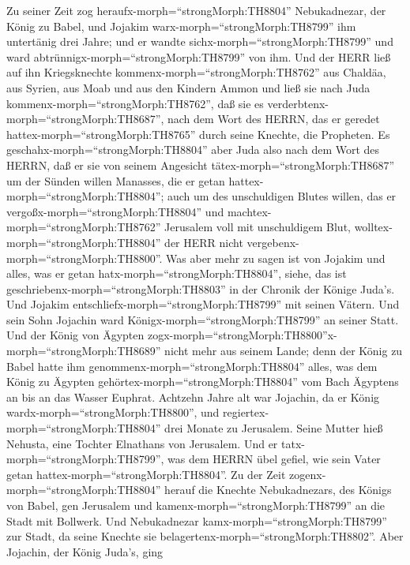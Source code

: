  Zu seiner Zeit zog heraufx-morph=``strongMorph:TH8804''
Nebukadnezar, der König zu Babel, und Jojakim
warx-morph=``strongMorph:TH8799'' ihm untertänig drei Jahre; und er
wandte sichx-morph=``strongMorph:TH8799'' und ward
abtrünnigx-morph=``strongMorph:TH8799'' von ihm.  Und der
HERR ließ auf ihn Kriegsknechte kommenx-morph=``strongMorph:TH8762'' aus
Chaldäa, aus Syrien, aus Moab und aus den Kindern Ammon und ließ sie
nach Juda kommenx-morph=``strongMorph:TH8762'', daß sie es
verderbtenx-morph=``strongMorph:TH8687'', nach dem Wort des HERRN, das
er geredet hattex-morph=``strongMorph:TH8765'' durch seine Knechte, die
Propheten.  Es geschahx-morph=``strongMorph:TH8804'' aber
Juda also nach dem Wort des HERRN, daß er sie von seinem Angesicht
tätex-morph=``strongMorph:TH8687'' um der Sünden willen Manasses, die er
getan hattex-morph=``strongMorph:TH8804'';  auch um des
unschuldigen Blutes willen, das er vergoßx-morph=``strongMorph:TH8804''
und machtex-morph=``strongMorph:TH8762'' Jerusalem voll mit unschuldigem
Blut, wolltex-morph=``strongMorph:TH8804'' der HERR nicht
vergebenx-morph=``strongMorph:TH8800''.  Was aber mehr zu
sagen ist von Jojakim und alles, was er getan
hatx-morph=``strongMorph:TH8804'', siehe, das ist
geschriebenx-morph=``strongMorph:TH8803'' in der Chronik der Könige
Juda's.  Und Jojakim
entschliefx-morph=``strongMorph:TH8799'' mit seinen Vätern. Und sein
Sohn Jojachin ward Königx-morph=``strongMorph:TH8799'' an seiner Statt.
 Und der König von Ägypten
zogx-morph=``strongMorph:TH8800''x-morph=``strongMorph:TH8689'' nicht
mehr aus seinem Lande; denn der König zu Babel hatte ihm
genommenx-morph=``strongMorph:TH8804'' alles, was dem König zu Ägypten
gehörtex-morph=``strongMorph:TH8804'' vom Bach Ägyptens an bis an das
Wasser Euphrat.  Achtzehn Jahre alt war Jojachin, da er
König wardx-morph=``strongMorph:TH8800'', und
regiertex-morph=``strongMorph:TH8804'' drei Monate zu Jerusalem. Seine
Mutter hieß Nehusta, eine Tochter Elnathans von Jerusalem. 
Und er tatx-morph=``strongMorph:TH8799'', was dem HERRN übel gefiel, wie
sein Vater getan hattex-morph=``strongMorph:TH8804''.  Zu
der Zeit zogenx-morph=``strongMorph:TH8804'' herauf die Knechte
Nebukadnezars, des Königs von Babel, gen Jerusalem und
kamenx-morph=``strongMorph:TH8799'' an die Stadt mit Bollwerk.
 Und Nebukadnezar kamx-morph=``strongMorph:TH8799'' zur
Stadt, da seine Knechte sie belagertenx-morph=``strongMorph:TH8802''.
 Aber Jojachin, der König Juda's, ging
